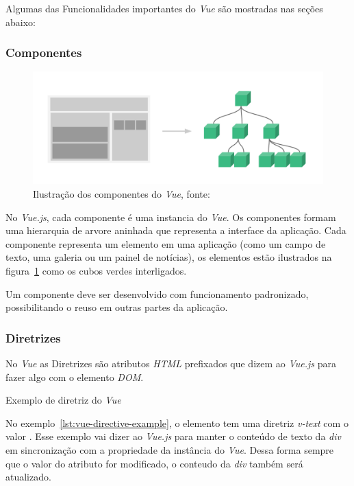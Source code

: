 Algumas das Funcionalidades importantes do \textit{Vue} são mostradas nas seções abaixo:

\subsubsection{Componentes}
\begin{figure}[h]
    \centering
    \includegraphics[keepaspectratio=true,scale=0.25]{figuras/vue-components.png}
    \caption{Ilustração dos componentes do \textit{Vue}, fonte: \cite{vuejs}}
    \label{fig:vue-components}
\end{figure}

No \textit{Vue.js}, cada componente é uma instancia do \textit{Vue}. Os componentes formam uma hierarquia de arvore aninhada que representa a interface da aplicação. Cada componente representa um elemento em uma aplicação (como um campo de texto, uma galeria ou um painel de notícias), os elementos estão ilustrados na figura~\ref{fig:vue-components} como os cubos verdes interligados.

Um componente deve ser desenvolvido com funcionamento padronizado, possibilitando o reuso em outras partes da aplicação.

\subsubsection{Diretrizes}
No \textit{Vue} as Diretrizes são atributos \textit{HTML} prefixados que dizem ao \textit{Vue.js} para fazer algo com o elemento \textit{DOM}.

\begin{listing}[H]
    \caption{Exemplo de diretriz do \textit{Vue}}
    \label{lst:vue-directive-example}
\end{listing}

No exemplo~\ref{lst:vue-directive-example}, o elemento tem uma diretriz \textit{v-text} com o valor . Esse exemplo vai dizer ao \textit{Vue.js} para manter o conteúdo de texto da \textit{div} em sincronização com a propriedade  da instância do \textit{Vue}. Dessa forma sempre que o valor do atributo for modificado, o conteudo da \textit{div} também será atualizado.

